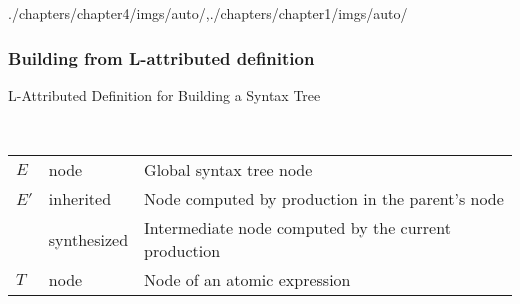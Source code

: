 \begin{graphicspathcontext}{{./chapters/chapter4/imgs/auto/},{./chapters/chapter1/imgs/auto/}}
\begin{bibunit}[apalike]
\subsubsection{Building from L-attributed definition}
\subsubsectiontableofcontentslide

\begin{frame}[t]{{L-Attributed Definition} for Building a Syntax Tree}
	\begin{center}\begin{small}
		\begin{sdd}[.8\linewidth]
		\end{sdd}
		\\[.2cm]
		\begin{tabularx}{.8\linewidth}{|l|l|X|}
				\hline
				\tabularheading \chead{Production} & \chead{Attribute} & \chead{Description} \\
				\hline
				$E$ & node & Global syntax tree node \\
				\hline
				$E'$ & inherited & Node computed by production in the parent's node \\
					\cline{2-3}
					& synthesized & Intermediate node computed by the current production \\
				\hline
				$T$ & node & Node of an atomic expression \\
				\hline
		\end{tabularx}
	\end{small}\end{center}
\end{frame}


\end{bibunit}
\end{graphicspathcontext}
